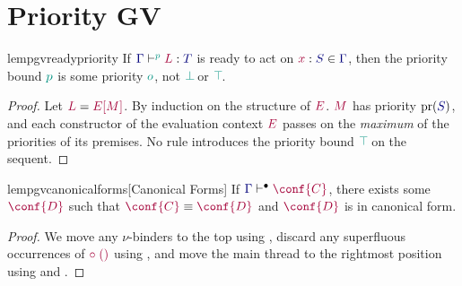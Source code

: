 \section{Priority GV}
\begingroup
{}















\begin{restatablelemma}{lempgvreadypriority}
  \label{lem:pgv-ready-priority}
  If $\tseq[\cs{p}]{\ty{\Gamma}}{L}{T}$ is ready to act on $\tmty{x}{S}\in\ty{\Gamma}$, then the priority bound $\cs{p}$ is some priority $\cs{o}$, \ie not $\cs{\pbot}$ or $\cs{\ptop}$.
\end{restatablelemma}
\begin{proof}
  Let $\tm{L}=\tm{\plug{E}{M}}$. By induction on the structure of $\tm{E}$. $\tm{M}$ has priority $\pr({\ty{S}})$, and each constructor of the evaluation context $\tm{E}$ passes on the \emph{maximum} of the priorities of its premises. No rule introduces the priority bound $\cs{\ptop}$ on the sequent.
\end{proof}

\begin{restatablelemma}{lempgvcanonicalforms}[Canonical Forms]
  \label{lem:pgv-canonical-forms}
  If $\cseq[\main]{\ty{\Gamma}}{\conf{C}}$, there exists some $\tm{\conf{D}}$ such that $\tm{\conf{C}}\equiv\tm{\conf{D}}$ and $\tm{\conf{D}}$ is in canonical form.
\end{restatablelemma}
\begin{proof}
  We move any $\nu$-binders to the top using , discard any superfluous occurrences of $\tm{\child\;\unit}$ using , and move the main thread to the rightmost position using  and .
\end{proof}

